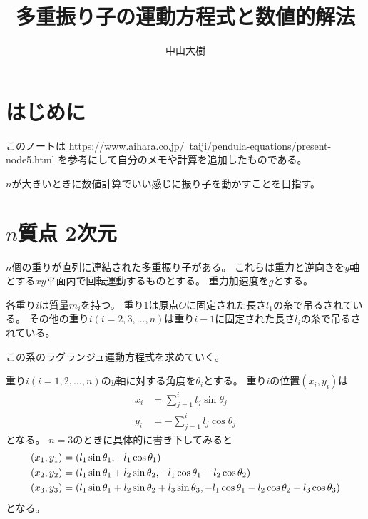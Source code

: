 \documentclass{jsarticle}
\title{多重振り子の運動方程式と数値的解法}
\author{中山大樹}
\newcommand{\eqa}[1]{\begin{align}#1\end{align}}
\begin{document}
\maketitle

\section{はじめに}

このノートは https://www.aihara.co.jp/~taiji/pendula-equations/present-node5.html を参考にして自分のメモや計算を追加したものである。

$n$が大きいときに数値計算でいい感じに振り子を動かすことを目指す。

\section{$n$質点 2次元}

$n$個の重りが直列に連結された多重振り子がある。
これらは重力と逆向きを$y$軸とする$xy$平面内で回転運動するものとする。
重力加速度を$g$とする。

各重り$i$は質量$m_i$を持つ。
重り$1$は原点$O$に固定された長さ$l_1$の糸で吊るされている。
その他の重り$i(i=2,3,\dots,n)$は重り$i-1$に固定された長さ$l_i$の糸で吊るされている。

この系のラグランジュ運動方程式を求めていく。

重り$i(i=1,2,\dots,n)$の$y$軸に対する角度を$\theta_i$とする。
重り$i$の位置$(x_i, y_i)$は
\eqa{
	x_i &= \sum_{j=1}^i l_j \sin\theta_j \\
	y_i &= -\sum_{j=1}^i l_j \cos\theta_j
}
となる。
$n=3$のときに具体的に書き下してみると
\eqa{
	\left(x_1, y_1\right) &= \left(l_1 \sin\theta_1, -l_1 \cos\theta_1\right) \notag\\
	\left(x_2, y_2\right) &= \left(l_1 \sin\theta_1 + l_2 \sin\theta_2, -l_1 \cos\theta_1 - l_2 \cos\theta_2\right) \notag\\
	\left(x_3, y_3\right) &= \left(
		l_1 \sin\theta_1 + l_2 \sin\theta_2 + l_3 \sin\theta_3,
		-l_1 \cos\theta_1 - l_2 \cos\theta_2 - l_3 \cos\theta_3
		\right) \notag
}
となる。
\end{document}
